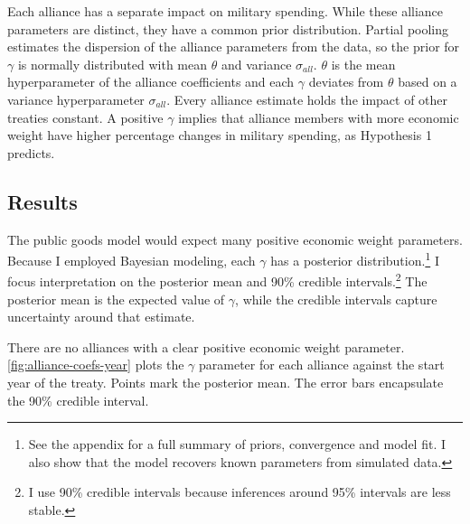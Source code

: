 \documentclass[12pt]{article}
\begin{document}
Each alliance has a separate impact on military spending.
While these alliance parameters are distinct, they have a common prior distribution.
Partial pooling estimates the dispersion of the alliance parameters from the data, so the prior for $\gamma$ is normally distributed with mean $\theta$ and variance $\sigma_{all}$. 
$\theta$ is the mean hyperparameter of the alliance coefficients and each $\gamma$ deviates from $\theta$ based on a variance hyperparameter $\sigma_{all}$.
Every alliance estimate holds the impact of other treaties constant. 
A positive $\gamma$ implies that alliance members with more economic weight have higher percentage changes in military spending, as Hypothesis 1 predicts. 
    


\subsection{Results} 


The public goods model would expect many positive economic weight parameters. 
Because I employed Bayesian modeling, each $\gamma$ has a posterior distribution.\footnote{See the appendix for a full summary of priors, convergence and model fit. I also show that the model recovers known parameters from simulated data.} 
I focus interpretation on the posterior mean and 90\% credible intervals.\footnote{I use 90\% credible intervals because inferences around 95\% intervals are less stable.}
The posterior mean is the expected value of $\gamma$, while the credible intervals capture uncertainty around that estimate.  


There are no alliances with a clear positive economic weight parameter.
\autoref{fig:alliance-coefs-year} plots the $\gamma$ parameter for each alliance against the start year of the treaty.
Points mark the posterior mean. 
The error bars encapsulate the 90\% credible interval.
\end{document}
